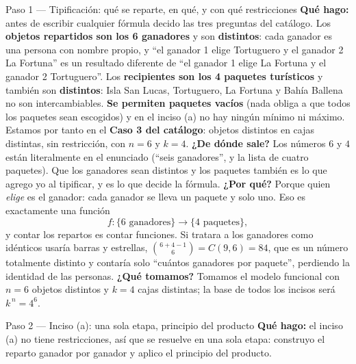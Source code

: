 \documentclass[11pt]{article}
\begin{document}
\begin{sol}

\begin{paso}{Paso 1 --- Tipificación: qué se reparte, en qué, y con qué restricciones}
\textbf{Qué hago:} antes de escribir cualquier fórmula decido las tres preguntas del catálogo. Los \textbf{objetos repartidos son los 6 ganadores} y son \textbf{distintos}: cada ganador es una persona con nombre propio, y ``el ganador 1 elige Tortuguero y el ganador 2 La Fortuna'' es un resultado diferente de ``el ganador 1 elige La Fortuna y el ganador 2 Tortuguero''. Los \textbf{recipientes son los 4 paquetes turísticos} y también son \textbf{distintos}: Isla San Lucas, Tortuguero, La Fortuna y Bahía Ballena no son intercambiables. \textbf{Se permiten paquetes vacíos} (nada obliga a que todos los paquetes sean escogidos) y en el inciso (a) no hay ningún mínimo ni máximo. Estamos por tanto en el \textbf{Caso 3 del catálogo}: objetos distintos en cajas distintas, sin restricción, con $n=6$ y $k=4$.
\textbf{¿De dónde sale?} Los números $6$ y $4$ están literalmente en el enunciado (``seis ganadores'', y la lista de cuatro paquetes). Que los ganadores sean distintos y los paquetes también es lo que agrego yo al tipificar, y es lo que decide la fórmula.
\textbf{¿Por qué?} Porque quien \emph{elige} es el ganador: cada ganador se lleva un paquete y solo uno. Eso es exactamente una función
\[
f:\{\text{6 ganadores}\}\longrightarrow\{\text{4 paquetes}\},
\]
y contar los repartos es contar funciones. Si tratara a los ganadores como idénticos usaría barras y estrellas, $\binom{6+4-1}{6}=C(9,6)=84$, que es un número totalmente distinto y contaría solo ``cuántos ganadores por paquete'', perdiendo la identidad de las personas.
\textbf{¿Qué tomamos?} Tomamos el modelo funcional con $n=6$ objetos distintos y $k=4$ cajas distintas; la base de todos los incisos será $k^{\,n}=4^6$.
\end{paso}

\begin{paso}{Paso 2 --- Inciso (a): una sola etapa, principio del producto}
\textbf{Qué hago:} el inciso (a) no tiene restricciones, así que se resuelve en una sola etapa: construyo el reparto ganador por ganador y aplico el principio del producto.


\end{paso}
\end{sol}
\end{document}
